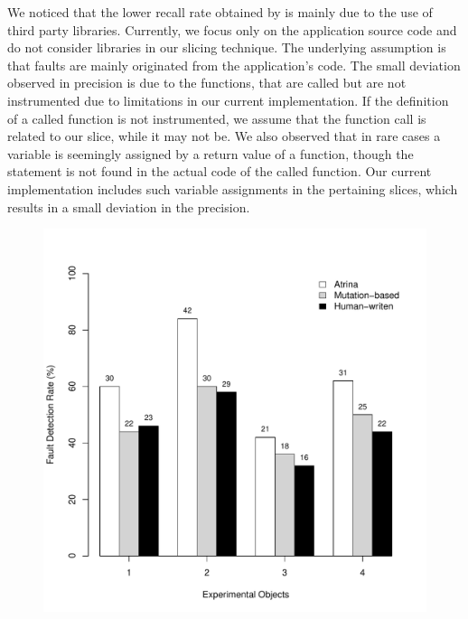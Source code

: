 We noticed that the lower recall rate obtained by \tool is mainly due to the use of third party libraries. Currently, we focus only on the application source code and do not consider libraries in our slicing technique. The underlying assumption is that faults are mainly originated from the application's code. The small deviation observed in precision is due to the functions, that are called but are not instrumented due to limitations in our current implementation. If the definition of a called function is not instrumented, we assume that the function call is related to our slice, while it may not be. We also observed that in rare cases a variable is seemingly assigned by a return value of a function, though the  statement is not found in the actual code of the called function. Our current implementation includes such variable assignments in the pertaining slices, which results in a small deviation in the precision.  

\begin{figure}[!t]
  \centering
  \includegraphics[width=1\hsize]{r-scripts/barplot-faultDetectionRate}
  \vspace{-0.18in}   
  \vspace{-0.1in} 
  \label{Fig:barplot-faultDetectionRate}
\end{figure}
